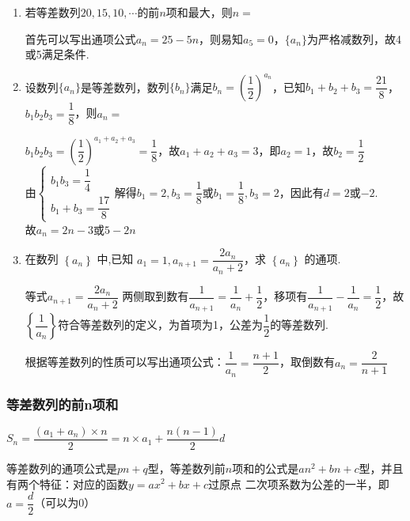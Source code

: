 \begin{enumerate}
    
    \item 若等差数列$20, 15, 10, \cdots$的前$n$项和最大，则$n = $
    \begin{jieda}
        首先可以写出通项公式$a_n = 25-5n$，则易知$a_5 = 0$，$\{a_n\}$为严格减数列，故4或5满足条件.
    \end{jieda}
    
    \item 设数列$\{a_n\}$是等差数列，数列$\{b_n\}$满足$b_n = \left(\dfrac{1}{2}\right)^{a_n}$，已知$b_1 + b_2 + b_3 = \dfrac{21}{8}$，$b_1b_2b_3 = \dfrac{1}{8}$，则$a_n = $
    \begin{jieda}
        $b_1b_2b_3 = \left(\dfrac{1}{2}\right)^{a_1 + a_2 + a_3} = \dfrac{1}{8}$，故$a_1 + a_2 + a_3 = 3$，即$a_2 = 1$，故$b_2 = \dfrac{1}{2}$ \\
        由$\left \{ \begin{array}{l}
             b_1 b_3 = \dfrac{1}{4}  \\
             b_1+b_3 = \dfrac{17}{8} 
        \end{array} \right.$解得$b_1 = 2, b_3 = \dfrac{1}{8}$或$b_1 = \dfrac{1}{8}, b_3 = 2$，因此有$d = 2$或$-2$. \\
        故$a_n = 2n-3$或$5-2n$
    \end{jieda}
    
    \item 在数列 $\left\{  {a}_{n}\right\}$ 中,已知 $a_1 = 1, a_{n + 1} = \dfrac{2a_n}{a_{n} + 2}$，求 $\left\{  {a}_{n}\right\}$ 的通项.
    \begin{jieda}
        等式$a_{n + 1} = \dfrac{2a_n}{a_{n} + 2}$ 两侧取到数有$\dfrac{1}{a_{n+1}} = \dfrac{1}{a_n} + \dfrac{1}{2}$，移项有$\dfrac{1}{{a}_{n + 1}} - \dfrac{1}{{a}_{n}} = \dfrac{1}{2}$，故$\left\{  \dfrac{1}{{a}_{n}}\right\}$符合等差数列的定义，为首项为1，公差为$\dfrac{1}{2}$的等差数列.
        
        根据等差数列的性质可以写出通项公式：$\dfrac{1}{a_n} = \dfrac{n+1}{2}$，取倒数有${a}_{n} = \dfrac{2}{n + 1}$
    \end{jieda}
\end{enumerate}
\subsubsection*{等差数列的前n项和}
$S_n = \dfrac{(a_1 + a_n) \times n}{2} = n \times a_1 + \dfrac{n(n-1)}{2}d$

等差数列的通项公式是$pn+q$型，等差数列前$n$项和的公式是$an^2+bn+c$型，并且有两个特征：对应的函数$y = ax^2+bx+c$过原点  二次项系数为公差的一半，即$a = \dfrac{d}{2}$（可以为0）

